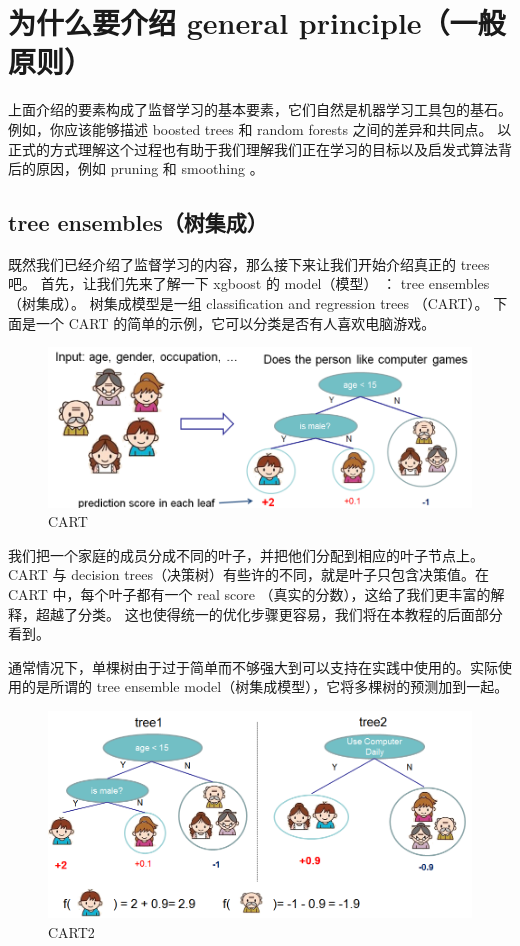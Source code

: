 \documentclass{article}
\begin{document}
\section{为什么要介绍 general principle（一般原则）}
上面介绍的要素构成了监督学习的基本要素，它们自然是机器学习工具包的基石。 例如，你应该能够描述 boosted trees 和 random forests 之间的差异和共同点。 以正式的方式理解这个过程也有助于我们理解我们正在学习的目标以及启发式算法背后的原因，例如 pruning 和 smoothing 。

\subsection{tree ensembles（树集成）}
既然我们已经介绍了监督学习的内容，那么接下来让我们开始介绍真正的 trees 吧。 首先，让我们先来了解一下 xgboost 的 model（模型） ： tree ensembles（树集成）。 树集成模型是一组 classification and regression trees （CART）。 下面是一个 CART 的简单的示例，它可以分类是否有人喜欢电脑游戏。
\begin{figure}[H]
	\centering
	\includegraphics{cart.png}
	\caption{CART}
\end{figure}


我们把一个家庭的成员分成不同的叶子，并把他们分配到相应的叶子节点上。 CART 与 decision trees（决策树）有些许的不同，就是叶子只包含决策值。在 CART 中，每个叶子都有一个 real score （真实的分数），这给了我们更丰富的解释，超越了分类。 这也使得统一的优化步骤更容易，我们将在本教程的后面部分看到。

通常情况下，单棵树由于过于简单而不够强大到可以支持在实践中使用的。实际使用的是所谓的 tree ensemble model（树集成模型），它将多棵树的预测加到一起。

\begin{figure}[H]
	\centering
	\includegraphics[scale=0.5]{twocart.png}
	\caption{CART2}
\end{figure}
\end{document}
